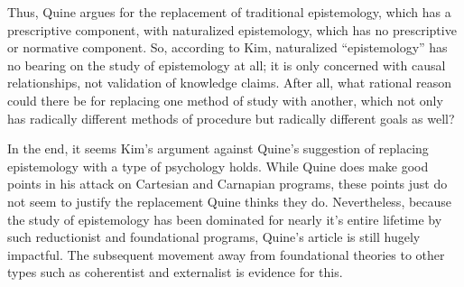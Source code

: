 \documentclass[12pt,letterpaper]{report}
\begin{document}
Thus, Quine argues for the replacement of traditional epistemology, which has a prescriptive component, with naturalized epistemology, which has no prescriptive or normative component. So, according to Kim, naturalized ``epistemology'' has no bearing on the study of epistemology at all; it is only concerned with causal relationships, not validation of knowledge claims. After all, what rational reason could there be for replacing one method of study with another, which not only has radically different methods of procedure but radically different goals as well?

In the end, it seems Kim's argument against Quine's suggestion of replacing epistemology with a type of psychology holds. While Quine does make good points in his attack on Cartesian and Carnapian programs, these points just do not seem to justify the replacement Quine thinks they do. Nevertheless, because the study of epistemology has been dominated for nearly it's entire lifetime by such reductionist and foundational programs, Quine's article is still hugely impactful. The subsequent movement away from foundational theories to other types such as coherentist and externalist is evidence for this.
\end{document}
